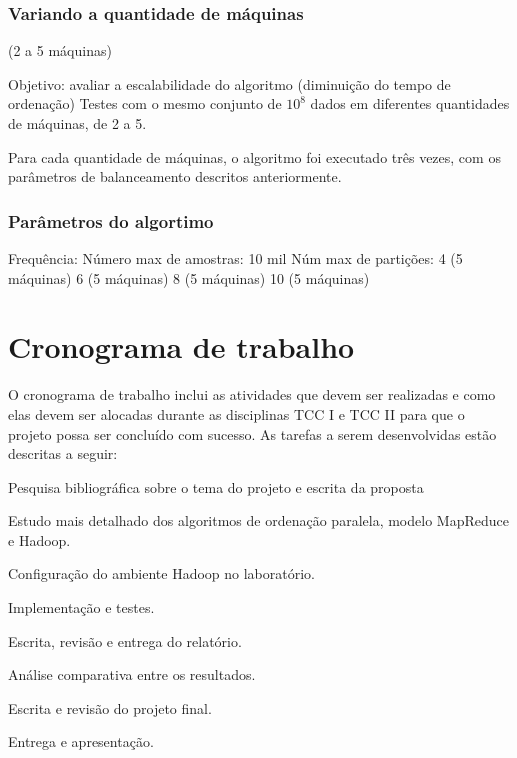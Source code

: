 \subsubsection{Variando a quantidade de máquinas}
 (2 a 5 máquinas)
 
 Objetivo: avaliar a escalabilidade do algoritmo (diminuição do tempo de ordenação) 
 Testes com o mesmo conjunto de $10^{8}$ dados em diferentes quantidades de máquinas, de 2 a 5. 
 
 Para cada quantidade de máquinas, o algoritmo foi executado três vezes, com os parâmetros de balanceamento descritos anteriormente.
 
\subsubsection{Parâmetros do algortimo}

Frequência:
Número max de amostras: 10 mil
Núm max de partições: 	4 (5 máquinas)
			6 (5 máquinas)
			8 (5 máquinas)
			10 (5 máquinas)



\section{Cronograma de trabalho}


O cronograma de trabalho inclui as atividades que devem ser realizadas e como elas devem ser alocadas durante as disciplinas TCC I e TCC II para que o projeto possa ser concluído com sucesso.
As tarefas a serem desenvolvidas estão descritas a seguir:

\begin{num_enum}
 \item \label{c1} Pesquisa bibliográfica sobre o tema do projeto e escrita da proposta
 \item \label{c2} Estudo mais detalhado dos algoritmos de ordenação paralela,  modelo MapReduce e Hadoop.
 \item \label{c3} Configuração do ambiente Hadoop no laboratório.
 \item \label{c4} Implementação e testes.
 \item \label{c5} Escrita, revisão e entrega do relatório. 
 \item \label{c7} Análise comparativa entre os resultados.
 \item \label{c8} Escrita e revisão do projeto final.
 \item \label{c9} Entrega e apresentação.
 \end{num_enum}
 
